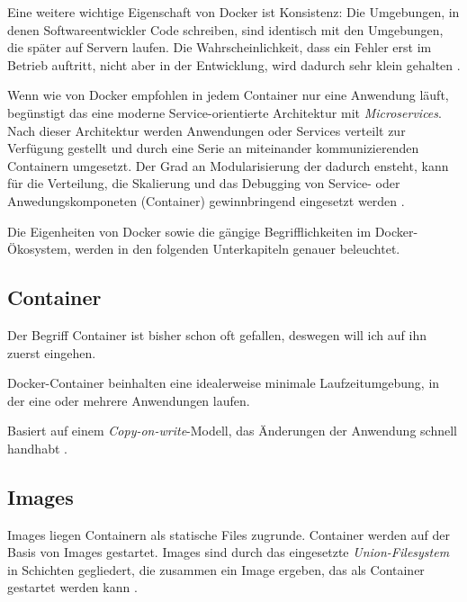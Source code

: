 \documentclass[11pt,a4paper,oneside]{report}
\begin{document}
    Eine weitere wichtige Eigenschaft von Docker ist Konsistenz: Die Umgebungen, in denen Softwareentwickler Code schreiben, sind identisch mit den Umgebungen, die später auf Servern laufen. Die Wahrscheinlichkeit, dass ein Fehler erst im Betrieb auftritt, nicht aber in der Entwicklung, wird dadurch sehr klein gehalten \cite[S.8]{dockerBook}.

    Wenn wie von Docker empfohlen in jedem Container nur eine Anwendung läuft, begünstigt das eine moderne Service-orientierte Architektur mit \emph{Microservices}. Nach dieser Architektur werden Anwendungen oder Services verteilt zur Verfügung gestellt und durch eine Serie an miteinander kommunizierenden Containern umgesetzt. Der Grad an Modularisierung der dadurch ensteht, kann für die Verteilung, die Skalierung und das Debugging von Service- oder Anwedungskomponeten (Container) gewinnbringend eingesetzt werden \cite[S.9]{dockerBook}.

    Die Eigenheiten von Docker sowie die gängige Begrifflichkeiten im Docker-Ökosystem, werden in den folgenden Unterkapiteln genauer beleuchtet.
    \subsection{Container}
      Der Begriff \glqq{}Container\grqq{} ist bisher schon oft gefallen, deswegen will ich auf ihn zuerst eingehen.

      Docker-Container beinhalten eine idealerweise minimale Laufzeitumgebung, in der eine oder mehrere Anwendungen laufen.

      Basiert auf einem \emph{Copy-on-write}-Modell, das Änderungen der Anwendung schnell handhabt \cite[S.8]{dockerBook}.
    \subsection{Images}
    \label{dockerImages}
      Images liegen Containern als statische Files zugrunde. Container werden auf der Basis von Images gestartet. Images sind durch das eingesetzte \emph{Union-Filesystem} in Schichten gegliedert, die zusammen ein Image ergeben, das als Container gestartet werden kann \cite[S.11]{dockerBook}.


\end{document}
